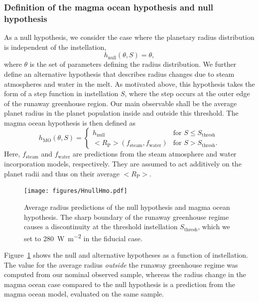 \documentclass[modern]{aastex631}
\begin{document}
\subsubsection{Definition of the magma ocean hypothesis and null hypothesis}
\begin{note}
    As a null hypothesis, we consider the case where the planetary radius distribution is independent of the instellation,
    \begin{equation}
        h_{\mathrm{null}}(\theta, S) = \theta,
    \end{equation}
    where $\theta$ is the set of parameters defining the radius distribution.
    We further define an alternative hypothesis that describes radius changes due to steam atmospheres and water in the melt.
    As motivated above, this hypothesis takes the form of a step function in instellation $S$, where the step occurs at the outer edge of the runaway greenhouse region.
    Our main observable shall be the average planet radius in the planet population inside and outside this threshold.
    The magma ocean hypothesis is then defined as
\begin{equation}
    h_{\mathrm{MO}}(\theta, S) =
        \begin{cases}
        h_{\mathrm{null}} & \text{for } S \leq S_\mathrm{thresh}\\
        <R_\mathrm{P}> (f_\mathrm{steam}, f_\mathrm{water}) & \text{for } S > S_\mathrm{thresh}.
    \end{cases}
\end{equation}
    Here, $f_\mathrm{steam}$ and $f_\mathrm{water}$ are predictions from the steam atmosphere and water incorporation models, respectively.
    They are assumed to act additively on the planet radii and thus on their average $<R_\mathrm{P}>$.


\begin{figure}
    \begin{centering}
        \texttt{[image: figures/HnullHmo.pdf]}
        \caption{Average radius predictions of the null hypothesis and magma ocean hypothesis. The sharp boundary of the runaway greenhouse regime causes a discontinuity at the threshold instellation $S_\mathrm{thresh}$, which we set to \SI{280}{\watt\per\meter\squared} in the fiducial case.}
        \label{fig:HnullHmo}
    \end{centering}
\end{figure}
    Figure~\ref{fig:HnullHmo} shows the null and alternative hypotheses as a function of instellation.
    The value for the average radius \textit{outside} the runaway greenhouse regime was computed from our nominal observed sample, whereas the radius change in the magma ocean case compared to the null hypothesis is a prediction from the magma ocean model, evaluated on the same sample.


\end{note}
\end{document}

